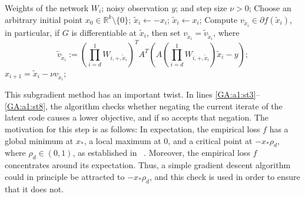 \begin{algorithm}
\caption{Provably convergent subgradient descent method}
\label{GA:a1}
\begin{algorithmic}[1]
\REQUIRE Weights of the network $W_i$; noisy observation $y$; and step size $\nu > 0$;
\STATE Choose an arbitrary initial point $x_0 \in \mathbb{R}^k \setminus \{0\}$;
  \label{GA:a1:st3}
\STATE $\tilde{x}_{i} \gets - x_{i}$; %
\ELSE
\STATE $\tilde{x}_i \gets x_i$;
\ENDIF \label{GA:a1:st8}
\STATE   Compute \label{GA:a1:st1} $v_{\tilde{x}_i} \in \partial f(\tilde{x}_i)$, in particular, if $G$ is differentiable at $\tilde{x}_i$, then set $v_{\tilde{x}_i} = \tilde{v}_{\tilde{x}_i}$,  where
$$
\tilde{v}_{\tilde{x}_i} := \left(\prod_{i = d}^1 W_{i, +, \tilde{x}_i}\right)^T A^T( A \left(\prod_{i = d}^1 W_{i, +, \tilde{x}_i}\right) \tilde{x}_i - y);
$$
\STATE $x_{i+1} = \tilde{x}_i - \nu {v}_{\tilde{x}_i}$;
\ENDFOR
\end{algorithmic}
\end{algorithm}






This subgradient method has an important twist.  In lines \ref{GA:a1:st3}--\ref{GA:a1:st8}, the algorithm checks whether negating the current iterate of the latent code causes a lower objective, and if so accepts that negation.  The motivation for this step is as follows:  In expectation, the empirical loss $f$ has a global minimum at $x_*$, a local maximum at 0, and a critical point at $-x_* \rho_d$, where $\rho_d \in (0, 1)$,
as established in~ \cite{HV17}.  Moreover, the empirical loss  $f$ concentrates around  its expectation. Thus, a simple gradient descent algorithm could in principle be attracted to $-x_* \rho_d$, and this check is used in order to ensure that it does not.

